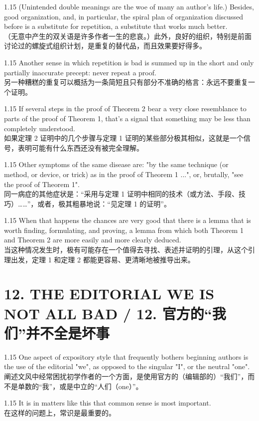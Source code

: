 \documentclass[12pt,a4paper]{article}
\newcommand{\bilingual}[2]{
    \begin{spacing}{1.15} %
        \noindent \normalsize #1 \\[-0.5ex] %
        \small \textcolor{blue!70!black}{#2} %
    \end{spacing}
    \vspace{0.8em} %
}
\begin{document}
\bilingual{(Unintended double meanings are the woe of many an author's life.) Besides, good organization, and, in particular, the spiral plan of organization discussed before is a substitute for repetition, a substitute that works much better.}
{（无意中产生的双关语是许多作者一生的悲哀。）此外，良好的组织，特别是前面讨论过的螺旋式组织计划，是重复的替代品，而且效果要好得多。} %

\bilingual{Another sense in which repetition is bad is summed up in the short and only partially inaccurate precept: never repeat a proof.}
{另一种糟糕的重复可以概括为一条简短且只有部分不准确的格言：永远不要重复一个证明。} %

\bilingual{If several steps in the proof of Theorem 2 bear a very close resemblance to parts of the proof of Theorem 1, that's a signal that something may be less than completely understood.}
{如果定理 2 证明中的几个步骤与定理 1 证明的某些部分极其相似，这就是一个信号，表明可能有什么东西还没有被完全理解。} %

\bilingual{Other symptoms of the same disease are: "by the same technique (or method, or device, or trick) as in the proof of Theorem 1 ...", or, brutally, "see the proof of Theorem 1".}
{同一病症的其他症状是：“采用与定理 1 证明中相同的技术（或方法、手段、技巧）……”，或者，极其粗暴地说：“见定理 1 的证明”。} %

\bilingual{When that happens the chances are very good that there is a lemma that is worth finding, formulating, and proving, a lemma from which both Theorem 1 and Theorem 2 are more easily and more clearly deduced.}
{当这种情况发生时，极有可能存在一个值得去寻找、表述并证明的引理，从这个引理出发，定理 1 和定理 2 都能更容易、更清晰地被推导出来。} %

\section*{12. THE EDITORIAL WE IS NOT ALL BAD / 12. 官方的“我们”并不全是坏事} %

\bilingual{One aspect of expository style that frequently bothers beginning authors is the use of the editorial "we", as opposed to the singular "I", or the neutral "one".}
{阐述文风中经常困扰初学作者的一个方面，是使用官方的（编辑部的）“我们”，而不是单数的“我”，或是中立的“人们（one）”。} %

\bilingual{It is in matters like this that common sense is most important.}
{在这样的问题上，常识是最重要的。} %
\end{document}
